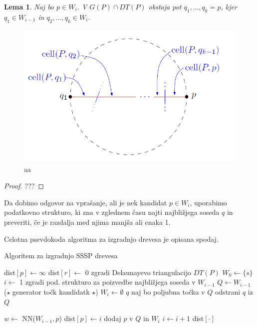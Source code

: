 \documentclass[a4paper, 12pt]{book}
\newtheorem{lema}[izrek]{Lema}
\begin{document}
\begin{lema}
Naj bo $p\in W_i$. V $G(P)\cap DT(P)$ obstaja pot $q_1,...,q_k = p$, kjer $q_1\in W_{i-1}$ in $q_2,...,q_k\in W_i$.
\end{lema}

\begin{figure}
\centerline{\includegraphics[scale=0.5]{pics/qp_path_proof.png}}
\caption{aa}
\label{c1c2}
\end{figure}

\begin{proof}
???
\end{proof}

Da dobimo odgovor na vprašanje, ali je nek kandidat $p\in W_i$, uporabimo podatkovno strukturo, ki zna v zglednem času najti najbližjega soseda $q$ in preveriti, če je razdalja med njima manjša ali enaka 1.

Celotna psevdokoda algoritma za izgradnjo drevesa je opisana spodaj.

\makeatletter
\def\BState{\State\hskip-\ALG@thistlm}
\makeatother

\begin{algorithm}
\caption{Algoritem za izgradnjo SSSP drevesa}\label{euclid}
\begin{algorithmic}[1]
\State dist$[p] \gets \infty$
\EndFor
\State dist$[r] \gets$ 0
\State zgradi Delaunayevo triangulacijo $DT(P)$
\State $W_{0} \gets \{ s \}$
\State $i \gets$ 1
\State zgradi pod. strukturo za poizvedbe najbližjega soseda v $W_{i-1}$
\State $Q \gets W_{i-1}$ ($\star$ generator točk kandidatk $\star$)
\State $W_{i} \gets \emptyset$
\State $q$ naj bo poljubna točka v $Q$
\State odstrani $q$ iz $Q$

\State $w \gets$ NN($W_{i-1},p$)
\State dist$[p] \gets i$
\State dodaj $p$ v $Q$ in $W_{i}$
\EndIf
\EndIf
\EndFor
\EndWhile
\State $i \gets i + 1$
\EndWhile
\State \Return dist$[\cdot]$
\EndProcedure
\end{algorithmic}
\end{algorithm}
\end{document}
